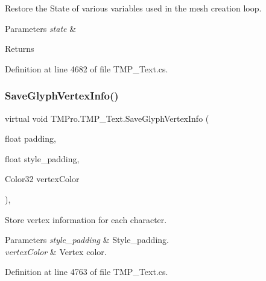 Restore the State of various variables used in the mesh creation loop. 


\begin{DoxyParams}{Parameters}
{\em state} & \\
\hline
\end{DoxyParams}
\begin{DoxyReturn}{Returns}

\end{DoxyReturn}


Definition at line 4682 of file T\+M\+P\+\_\+\+Text.\+cs.

\mbox{\label{class_t_m_pro_1_1_t_m_p___text_ac62ca7572491147ae78efdbbab12c953}} 
\subsubsection{\texorpdfstring{SaveGlyphVertexInfo()}{SaveGlyphVertexInfo()}}
{\footnotesize\ttfamily virtual void T\+M\+Pro.\+T\+M\+P\+\_\+\+Text.\+Save\+Glyph\+Vertex\+Info (\begin{DoxyParamCaption}\item[{float}]{padding,  }\item[{float}]{style\+\_\+padding,  }\item[{Color32}]{vertex\+Color }\end{DoxyParamCaption})\hspace{0.3cm}{\ttfamily [protected]}, {\ttfamily [virtual]}}



Store vertex information for each character. 


\begin{DoxyParams}{Parameters}
{\em style\+\_\+padding} & Style\+\_\+padding.\\
\hline
{\em vertex\+Color} & Vertex color.\\
\hline
\end{DoxyParams}


Definition at line 4763 of file T\+M\+P\+\_\+\+Text.\+cs.

\mbox{\label{class_t_m_pro_1_1_t_m_p___text_ab4339f4e5cc87fd75ef8a52106ede97e}} 
